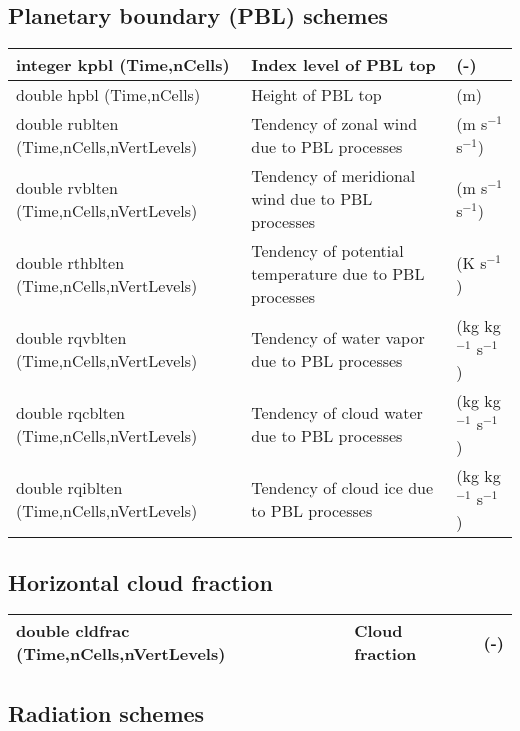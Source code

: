 \subsection{Planetary boundary (PBL) schemes}

{\small
\begin{longtable}{|p{2.0in} |p{3.0in} |p{1.0in}|}
\hline
integer kpbl (Time,nCells)  & Index level of PBL top & (-) \\ \hline
double hpbl (Time,nCells)  & Height of PBL top & (m) \\ \hline
double rublten \hfil\break (Time,nCells,nVertLevels)  & Tendency of zonal wind due to PBL processes  & (m s$^{-1}$ s$^{-1}$) \\ \hline
double rvblten \hfil\break (Time,nCells,nVertLevels)  &  Tendency of meridional wind due to PBL processes & (m s$^{-1}$ s$^{-1}$) \\ \hline
double rthblten  \hfil\break (Time,nCells,nVertLevels)  &  Tendency of potential temperature due to PBL processes& (K s$^{-1}$) \\ \hline
double rqvblten \hfil\break (Time,nCells,nVertLevels)  &  Tendency of water vapor due to PBL processes & (kg kg$^{-1}$ s$^{-1}$) \\ \hline
double rqcblten \hfil\break (Time,nCells,nVertLevels)  &  Tendency of cloud water due to PBL processes & (kg kg$^{-1}$ s$^{-1}$) \\ \hline
double rqiblten \hfil\break (Time,nCells,nVertLevels)  &  Tendency of cloud ice due to PBL processes & (kg kg$^{-1}$ s$^{-1}$) \\ \hline
\end{longtable}
}

\subsection{Horizontal cloud fraction}

{\small
\begin{longtable}{|p{2.0in}|p{3.0in}|p{1.0in}|}
\hline
double cldfrac \hfil\break (Time,nCells,nVertLevels) & Cloud fraction & (-)\\ \hline
\end{longtable}
}

\subsection{Radiation schemes}

